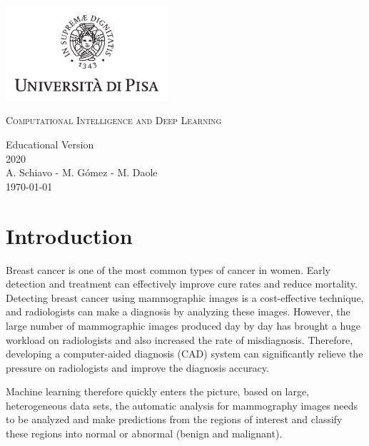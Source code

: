 \documentclass{book}
\begin{document}
    \begin{titlepage}
        \centering
        \includegraphics[width=6cm]{logo-unipi.png}
        \vfill
        \vspace{1.5cm}
        {\huge\textsc{Computational Intelligence and Deep Learning}\par}
        {\Large
            Educational Version\\
            2020\\
            \vspace{2cm}
            A. Schiavo - M. Gómez - M. Daole \\
            \vspace{2cm}
            \today
        }    
        \vfill
        \vfill
    \end{titlepage}
    \tableofcontents


    \chapter{Introduction}

    Breast cancer is one of the most common types of cancer in women. Early detection and treatment can effectively improve cure rates and reduce mortality. Detecting breast cancer using mammographic images is a cost-effective technique, and radiologists can make a diagnosis by analyzing these images. However, the large number of mammographic images produced day by day has brought a huge workload on radiologists and also increased the rate of misdiagnosis. Therefore, developing a computer-aided diagnosis (CAD) system can significantly relieve the pressure on radiologists and improve the diagnosis accuracy.
    
    Machine learning therefore quickly enters the picture, based on large, heterogeneous data sets, the automatic analysis for mammography images needs to be analyzed and make predictions from the regions of interest and classify these regions into normal or abnormal (benign and malignant).
    

\end{document}
